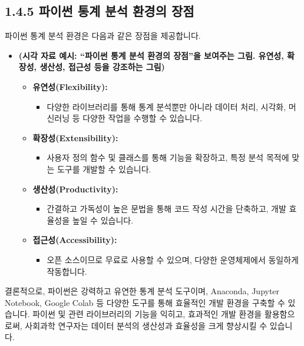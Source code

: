\documentclass[
  letterpaper,
]{book}
\providecommand{\tightlist}{%
  \setlength{\itemsep}{0pt}\setlength{\parskip}{0pt}}
\begin{document}
\subsection{1.4.5 파이썬 통계 분석 환경의
장점}\label{uxd30cuxc774uxc36c-uxd1b5uxacc4-uxbd84uxc11d-uxd658uxacbduxc758-uxc7a5uxc810}

파이썬 통계 분석 환경은 다음과 같은 장점을 제공합니다.

\begin{itemize}
\item
  \textbf{(시각 자료 예시: ``파이썬 통계 분석 환경의 장점''을 보여주는
  그림. 유연성, 확장성, 생산성, 접근성 등을 강조하는 그림)}

  \begin{itemize}
  \tightlist
  \item
    \textbf{유연성(Flexibility):}

    \begin{itemize}
    \tightlist
    \item
      다양한 라이브러리를 통해 통계 분석뿐만 아니라 데이터 처리, 시각화,
      머신러닝 등 다양한 작업을 수행할 수 있습니다.
    \end{itemize}
  \item
    \textbf{확장성(Extensibility):}

    \begin{itemize}
    \tightlist
    \item
      사용자 정의 함수 및 클래스를 통해 기능을 확장하고, 특정 분석
      목적에 맞는 도구를 개발할 수 있습니다.
    \end{itemize}
  \item
    \textbf{생산성(Productivity):}

    \begin{itemize}
    \tightlist
    \item
      간결하고 가독성이 높은 문법을 통해 코드 작성 시간을 단축하고, 개발
      효율성을 높일 수 있습니다.
    \end{itemize}
  \item
    \textbf{접근성(Accessibility):}

    \begin{itemize}
    \tightlist
    \item
      오픈 소스이므로 무료로 사용할 수 있으며, 다양한 운영체제에서
      동일하게 작동합니다.
    \end{itemize}
  \end{itemize}
\end{itemize}

결론적으로, 파이썬은 강력하고 유연한 통계 분석 도구이며, Anaconda,
Jupyter Notebook, Google Colab 등 다양한 도구를 통해 효율적인 개발
환경을 구축할 수 있습니다. 파이썬 및 관련 라이브러리의 기능을 익히고,
효과적인 개발 환경을 활용함으로써, 사회과학 연구자는 데이터 분석의
생산성과 효율성을 크게 향상시킬 수 있습니다.
\end{document}
